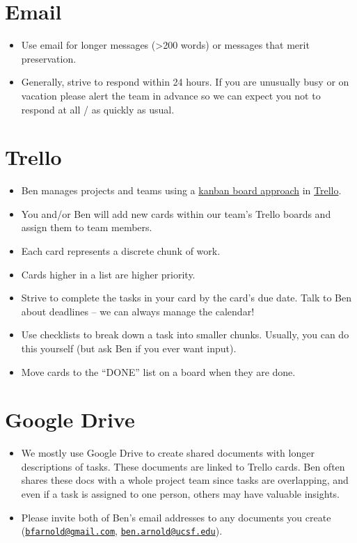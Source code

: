 \documentclass[]{book}
\providecommand{\tightlist}{%
  \setlength{\itemsep}{0pt}\setlength{\parskip}{0pt}}
\begin{document}
\hypertarget{email}{%
\section{Email}\label{email}}

\begin{itemize}
\tightlist
\item
  Use email for longer messages (\textgreater{}200 words) or messages that merit preservation.
\item
  Generally, strive to respond within 24 hours. If you are unusually busy or on vacation please alert the team in advance so we can expect you not to respond at all / as quickly as usual.
\end{itemize}

\hypertarget{trello}{%
\section{Trello}\label{trello}}

\begin{itemize}
\tightlist
\item
  Ben manages projects and teams using a \href{https://www.atlassian.com/agile/kanban/boards}{kanban board approach} in \href{https://www.trello.com}{Trello}.
\item
  You and/or Ben will add new cards within our team's Trello boards and assign them to team members.
\item
  Each card represents a discrete chunk of work.
\item
  Cards higher in a list are higher priority.
\item
  Strive to complete the tasks in your card by the card's due date. Talk to Ben about deadlines -- we can always manage the calendar!
\item
  Use checklists to break down a task into smaller chunks. Usually, you can do this yourself (but ask Ben if you ever want input).
\item
  Move cards to the ``DONE'' list on a board when they are done.
\end{itemize}

\hypertarget{google-drive}{%
\section{Google Drive}\label{google-drive}}

\begin{itemize}
\tightlist
\item
  We mostly use Google Drive to create shared documents with longer descriptions of tasks. These documents are linked to Trello cards. Ben often shares these docs with a whole project team since tasks are overlapping, and even if a task is assigned to one person, others may have valuable insights.
\item
  Please invite both of Ben's email addresses to any documents you create (\href{mailto:bfarnold@gmail.com}{\nolinkurl{bfarnold@gmail.com}}, \href{mailto:ben.arnold@ucsf.edu}{\nolinkurl{ben.arnold@ucsf.edu}}).
\end{itemize}
\end{document}
